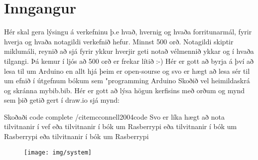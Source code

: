 \section{Inngangur}
Hér skal gera lýsingu á verkefninu þ.e hvað,  hvernig og  hvaða forritunarmál, fyrir hverja og hvaða notagildi verkefnið hefur. Minnst 500 orð. Notagildi skiptir miklumáli, reynið að sjá fyrir ykkur hverjir geti notað vélmennið ykkar og í hvaða tilgangi.  Þá kemur í ljós að 500 orð er frekar lítið :-) Hér er gott að byrja á því að lesa til um Arduino en allt hjá þeim er open-sourse og svo er hægt að lesa sér til um efnið í útgefnum bókum sem "programming Arduino \cite{monk} Skoðið vel heimildaskrá og skránna mybib.bib. Hér er gott að lýsa högun kerfisins með orðum og mynd sem þið getið gert í draw.io sjá mynd: 

Skoðaði code complete /cite{mcconnell2004code}
Svo er líka hægt að nota tilvitnanir í vef \cite{WinNT}
eða tilvitnanir í bók um Rasberrypi \cite{brock2013changing}
eða tilvitnanir í bók um Rasberrypi \cite{test}
eða tilvitnanir í bók um Rasberrypi \cite{test2}
\begin{figure}[h]
\texttt{[image: img/system]}
\end{figure}